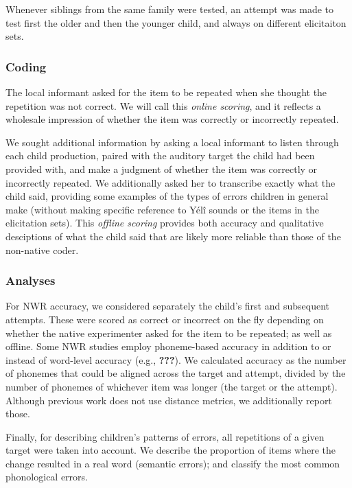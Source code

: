 \documentclass[english,,man,floatsintext]{apa6}
\begin{document}
Whenever siblings from the same family were tested, an attempt was made to test first the older and then the younger child, and always on different elicitaiton sets.

\hypertarget{coding}{%
\subsubsection{Coding}\label{coding}}

The local informant asked for the item to be repeated when she thought the repetition was not correct. We will call this \emph{online scoring}, and it reflects a wholesale impression of whether the item was correctly or incorrectly repeated.

We sought additional information by asking a local informant to listen through each child production, paired with the auditory target the child had been provided with, and make a judgment of whether the item was correctly or incorrectly repeated. We additionally asked her to transcribe exactly what the child said, providing some examples of the types of errors children in general make (without making specific reference to Yélî sounds or the items in the elicitation sets). This \emph{offline scoring} provides both accuracy and qualitative desciptions of what the child said that are likely more reliable than those of the non-native coder.

\hypertarget{analyses}{%
\subsubsection{Analyses}\label{analyses}}

For NWR accuracy, we considered separately the child's first and subsequent attempts. These were scored as correct or incorrect on the fly depending on whether the native experimenter asked for the item to be repeated; as well as offline. Some NWR studies employ phoneme-based accuracy in addition to or instead of word-level accuracy (e.g., {\textbf{???}}). We calculated accuracy as the number of phonemes that could be aligned across the target and attempt, divided by the number of phonemes of whichever item was longer (the target or the attempt). Although previous work does not use distance metrics, we additionally report those.

Finally, for describing children's patterns of errors, all repetitions of a given target were taken into account. We describe the proportion of items where the change resulted in a real word (semantic errors); and classify the most common phonological errors.
\end{document}
